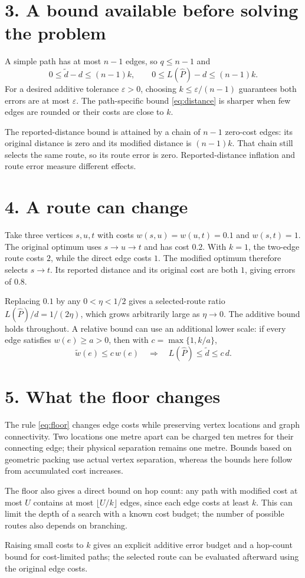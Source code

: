 \documentclass[11pt]{article}
\begin{document}
\newpage
\section*{3. A bound available before solving the problem}
A simple path has at most $n-1$ edges, so $q\le n-1$ and
\begin{equation}\label{eq:universal}
 \boxed{\quad
 0\le\widetilde d-d\le(n-1)k,\qquad
 0\le L(\widehat P)-d\le(n-1)k.
 \quad}
\end{equation}
For a desired additive tolerance $\varepsilon>0$, choosing
$k\le\varepsilon/(n-1)$ guarantees both errors are at most $\varepsilon$.
The path-specific bound \eqref{eq:distance} is sharper when few edges
are rounded or their costs are close to $k$.

The reported-distance bound is attained by a chain of $n-1$ zero-cost
edges: its original distance is zero and its modified distance is
$(n-1)k$. That chain still selects the same route, so its route error is
zero. Reported-distance inflation and route error measure different effects.

\section*{4. A route can change}
Take three vertices $s,u,t$ with costs $w(s,u)=w(u,t)=0.1$ and
$w(s,t)=1$. The original optimum uses $s\to u\to t$ and has cost $0.2$.
With $k=1$, the two-edge route costs $2$, while the direct edge costs $1$.
The modified optimum therefore selects $s\to t$. Its reported distance
and its original cost are both $1$, giving errors of $0.8$.

Replacing $0.1$ by any $0<\eta<1/2$ gives a selected-route ratio
$L(\widehat P)/d=1/(2\eta)$, which grows arbitrarily large as
$\eta\to0$. The additive bound holds throughout. A relative bound can
use an additional lower scale: if every edge satisfies $w(e)\ge a>0$,
then with $c=\max\{1,k/a\}$,
\[
 \widetilde w(e)\le c\,w(e)
 \quad\Longrightarrow\quad
 L(\widehat P)\le\widetilde d\le c\,d.
\]

\section*{5. What the floor changes}
The rule \eqref{eq:floor} changes edge costs while preserving vertex
locations and graph connectivity. Two locations one metre apart can be
charged ten metres for their connecting edge; their physical separation
remains one metre. Bounds based on geometric packing use actual vertex
separation, whereas the bounds here follow from accumulated cost increases.

The floor also gives a direct bound on hop count: any path with modified
cost at most $U$ contains at most $\lfloor U/k\rfloor$ edges, since each
edge costs at least $k$. This can limit the depth of a search with a known
cost budget; the number of possible routes also depends on branching.

\begin{takeaway}
Raising small costs to $k$ gives an explicit additive error budget and a
hop-count bound for cost-limited paths; the selected route can be evaluated
afterward using the original edge costs.
\end{takeaway}
\end{document}
